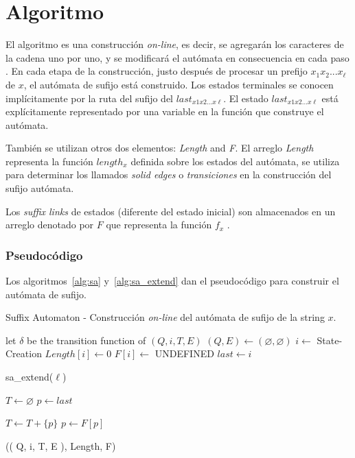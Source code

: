 \newcommand*{\skipnumber}[2][1]{%
	{\renewcommand*{\alglinenumber}[1]{}\State #2}%
	\addtocounter{ALG@line}{-#1}}

\section{Algoritmo}\label{Algorithm}

El algoritmo es una construcción \textit{on-line},  es decir, se agregarán los caracteres de la cadena uno por uno, y se modificará el autómata en consecuencia en cada paso \cite{web:cp-suffix-automaton}. En cada etapa de la construcción, justo después de procesar un prefijo $x_1x_2...x_\ell$ de $x$, el autómata de sufijo está construido. Los estados terminales se conocen implícitamente por la ruta del sufijo del $last_{x1x2...x\ell}$. El estado $last_{x1x2...x\ell}$ está explícitamente representado por una variable en la función que construye el autómata.

También se utilizan otros dos elementos: \textit{Length} and \textit{F}. El arreglo \textit{Length} representa la función $length_x$ definida sobre los estados del autómata, se utiliza para determinar los llamados \textit{solid edges} o \textit{transiciones} en la construcción del sufijo autómata.

Los \textit{suffix links} de estados (diferente del estado inicial) son almacenados en un arreglo denotado por $F$ que representa la función $f_x$ \cite{book:Crochemore1997}.

\subsubsection{Pseudocódigo}
Los algoritmos~\ref{alg:sa} y~\ref{alg:sa_extend} dan el pseudocódigo para construir el autómata de sufijo.

\begin{alg}
	Suffix Automaton - Construcción \textit{on-line} del autómata de sufijo de la \gls{string} $x$.
	\label{alg:sa}
	\begin{algorithmic}[1]
			\State let $\delta$ be the transition function of $(Q, i, T, E)$
			\State $(Q, E) \leftarrow (\varnothing, \varnothing)$
			\State $i \leftarrow$ State-Creation
			\State $Length[i] \leftarrow 0$
			\State $F[i] \leftarrow$ UNDEFINED
			\State $last \leftarrow i$
			
				\State  sa\_extend($\ell$)
			\EndFor
			
			\State $T \leftarrow \varnothing$
			\State $p \leftarrow last$
			
				\State $T \leftarrow T + \{p\}$
				\State $p \leftarrow F[p]$
			\EndWhile
			
			\State \Return (( Q, i, T, E ), Length, F)		
		\EndFunction
	\end{algorithmic}
\end{alg}


